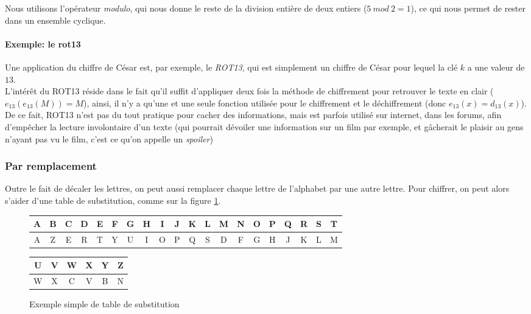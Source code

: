 
Nous utilisons l'opérateur \emph{modulo}, qui nous donne le reste de
la division entière de deux entiers ($5~ mod~ 2 = 1$), ce qui nous
permet de rester dans un ensemble cyclique. \\

\paragraph{Exemple: le rot13\label{syst:rot13}}
Une application du chiffre de César est, par exemple, le \emph{ROT13},
qui est simplement un chiffre de César pour lequel la clé $k$ a une
valeur de $13$.\\

L'intérêt du ROT13 réside dans le fait qu'il suffit d'appliquer deux
fois la méthode de chiffrement pour retrouver le texte en clair
($e_{13}(e_{13}(M)) = M$), ainsi, il n'y a qu'une et une seule fonction utilisée
pour le chiffrement et le déchiffrement (donc $e_{13}(x) =
d_{13}(x)$). \\

De ce fait, ROT13 n'est pas du tout pratique pour cacher des
informations, mais est parfois utilisé sur internet, dans les forums,
afin d'empêcher la lecture involontaire d'un texte (qui pourrait
dévoiler une information sur un film par exemple, et gâcherait le
plaisir au gens n'ayant pas vu le film, c'est ce qu'on appelle un 
\emph{spoiler}) 

\subsubsection{Par remplacement}
Outre le fait de décaler les lettres, on peut aussi remplacer chaque
lettre de l'alphabet par une autre lettre. Pour chiffrer, on peut alors
s'aider d'une table de substitution, comme sur la figure
\ref{fig:SubstitutionSimple}.

 \begin{figure}[h]
   \begin{center}
    \begin{tabular}{|c|c|c|c|c|c|c|c|c|c|c|c|c|c|c|c|c|c|c|c}
      \hline
      A & B & C & D & E & F & G & H & I & J & K & L & M & N & O & P &
      Q & R & S & T \\
      \hline
      A & Z & E & R & T & Y & U & I & O & P & Q & S & D & F & G & H &
      J & K & L & M \\
      \hline
    \end{tabular}
  \end{center}
  \begin{flushright}
    \begin{tabular}{c|c|c|c|c|c|}
      \hline
      U & V & W & X & Y & Z \\
      \hline
      W & X & C & V & B & N \\
      \hline
    \end{tabular}
  \end{flushright}
  \caption{Exemple simple de table de substitution}
  \label{fig:SubstitutionSimple}
\end{figure}

